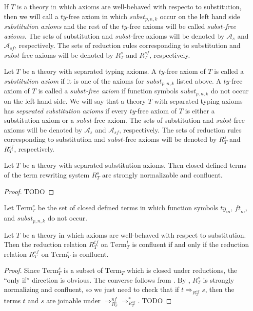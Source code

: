 \documentclass[reqno]{amsart}
\theoremstyle{definition}
\theoremstyle{remark}
\newcommand{\Term}{\mathrm{Term}}
\newcommand{\subst}{\mathit{subst}}
\newcommand{\ft}{\mathit{ft}}
\newcommand{\ty}{\mathit{ty}}
\numberwithin{figure}{section}
\begin{document}
If $T$ is a theory in which axioms are well-behaved with respecto to substitution, then we will call a $\ty$-free axiom
in which $\subst_{p,n,k}$ occur on the left hand side \emph{substitution axioms} and the rest of the $\ty$-free axioms will be called \emph{$\subst$-free axioms}.
The sets of substitution and $\subst$-free axioms will be denoted by $\mathcal{A}_s$ and $\mathcal{A}_{sf}$, respectively.
The sets of reduction rules corresponding to substitution and $\subst$-free axioms will be denoted by $R^s_T$ and $R^{sf}_T$, respectively.

Let $T$ be a theory with separated typing axioms.
A $\ty$-free axiom of $T$ is called a \emph{substitution axiom} if it is one of the axioms for $\subst_{p,n,k}$ listed above.
A $\ty$-free axiom of $T$ is called a \emph{$\subst$-free axiom} if function symbols $\subst_{p,n,k}$ do not occur on the left hand side.
We will say that a theory $T$ with separated typing axioms has \emph{separated substitution axioms} if every $\ty$-free axiom of $T$ is either a substitution axiom or a $\subst$-free axiom.
The sets of substitution and $\subst$-free axioms will be denoted by $\mathcal{A}_s$ and $\mathcal{A}_{sf}$, respectively.
The sets of reduction rules corresponding to substitution and $\subst$-free axioms will be denoted by $R^s_T$ and $R^{sf}_T$, respectively.

\begin{lem}
Let $T$ be a theory with separated substitution axioms.
Then closed defined terms of the term rewriting system $R^s_T$ are strongly normalizable and confluent.
\end{lem}
\begin{proof}
TODO
\end{proof}

Let $\Term_T^s$ be the set of closed defined terms in which function symbols $\ty_m$, $\ft_m$, and $\subst_{p,n,k}$ do not occur.

\begin{prop}
Let $T$ be a theory in which axioms are well-behaved with respect to substitution.
Then the reduction relation $R^{tf}_T$ on $\Term_T^t$ is confluent if and only if the reduction relation $R^{sf}_T$ on $\Term_T^s$ is confluent.
\end{prop}
\begin{proof}
Since $\Term_T^s$ is a subset of $\Term_T$ which is closed under reductions, the ``only if'' direction is obvious.
The converse follows from .
By , $R_T^s$ is strongly normalizing and confluent, so we just need to check that if $t \Rightarrow_{R_T^{sf}} s$,
then the terms $t$ and $s$ are joinable under $\Rightarrow_{R_T^s}^{nf} \Rightarrow_{R_T^{sf}}^*$.
TODO
\end{proof}
\end{document}
